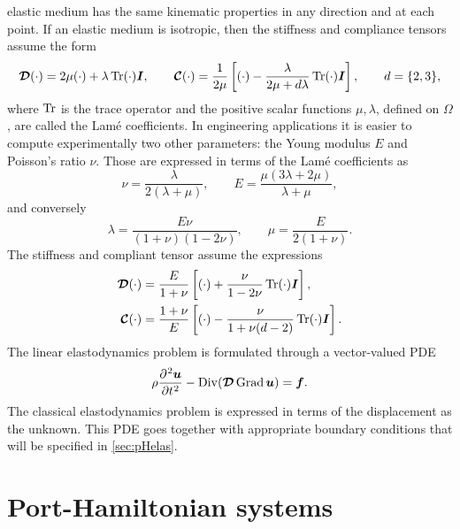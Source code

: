 elastic medium has the same kinematic properties in any direction and at each point. If an elastic medium is isotropic, then the stiffness and compliance tensors assume the form
\begin{equation}
\bm{\mathcal{D}}(\cdot) = 2\mu (\cdot) + \lambda \operatorname{Tr}(\cdot)\bm{I}, \qquad \bm{\mathcal{C}}(\cdot) = \frac{1}{2\mu}\left[(\cdot) - \frac{\lambda}{2\mu + d\lambda}\operatorname{Tr}(\cdot)\bm{I}\right], \qquad d= \{2,3\},
\end{equation}
where  $\operatorname{Tr}$ is the trace operator and the positive scalar functions $\mu, \lambda$, defined on $\Omega$, are called the Lam\'e coefficients. In engineering applications it is easier to compute experimentally two other parameters: the Young modulus $E$ and  Poisson's ratio $\nu$. Those are expressed in terms of the Lam\'e  coefficients as 
\begin{equation}
\nu =\frac{\lambda}{2(\lambda +\mu)}, \qquad 
E=\frac{\mu (3\lambda +2\mu)}{\lambda +\mu},
\end{equation}
and conversely
\begin{equation}
\lambda =\frac {E \nu }{(1+\nu )(1-2\nu )}, \qquad
\mu = \frac{E}{2(1+\nu)}.
\end{equation}
The stiffness and compliant tensor assume the expressions
\begin{align}
	\bm{\mathcal{D}}(\cdot) &= \frac{E}{1+\nu} \left[(\cdot) + \frac{\nu}{1-2\nu}\Tr(\cdot)\bm{I}\right], \label{eq:stiff3D} \vspace{3pt}\\
	\bm{\mathcal{C}}(\cdot) &= \frac{1+\nu}{E}\left[(\cdot) - \frac{\nu}{1+\nu(d-2)}\Tr(\cdot)\bm{I}\right].
\end{align}
The linear elastodynamics problem is formulated through a vector-valued PDE
\begin{equation}\label{eq:lin_elastodyn}
\rho \diffp[2]{\bm{u}}{t} - \Div(\bm{\mathcal{D}} \Grad \bm{u}) = \bm{f}.
\end{equation}  
The classical elastodynamics problem is expressed in terms of the displacement as the unknown. This PDE goes together with appropriate boundary conditions that will be specified in \ref{sec:pHelas}.

\section{Port-Hamiltonian systems}

